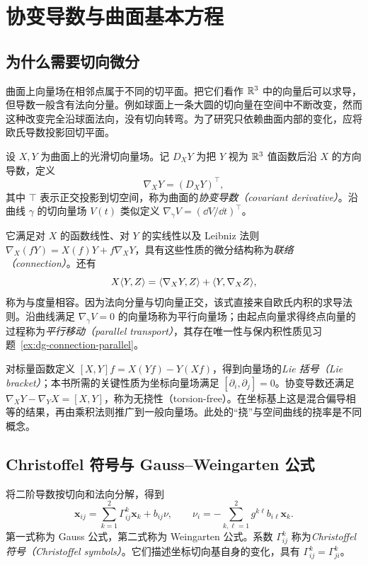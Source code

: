 \setcounter{chapter}{7} %
\chapter{协变导数与曲面基本方程}
\label{chap:dg-connection}

\section{为什么需要切向微分}
曲面上向量场在相邻点属于不同的切平面。把它们看作 $\mathbb R^3$ 中的向量后可以求导，但导数一般含有法向分量。例如球面上一条大圆的切向量在空间中不断改变，然而这种改变完全沿球面法向，没有切向转弯。为了研究只依赖曲面内部的变化，应将欧氏导数投影回切平面。

\begin{definition}[协变导数]
设 $X,Y$ 为曲面上的光滑切向量场。记 $D_XY$ 为把 $Y$ 视为 $\mathbb R^3$ 值函数后沿 $X$ 的方向导数，定义
\[
 \nabla_XY=(D_XY)^\top,
\]
其中 $\top$ 表示正交投影到切空间，称为曲面的\emph{协变导数（covariant derivative）}。沿曲线 $\gamma$ 的切向量场 $V(t)$ 类似定义 $\nabla_{\dot\gamma}V=(\dd V/\dd t)^\top$。
\end{definition}
它满足对 $X$ 的函数线性、对 $Y$ 的实线性以及 Leibniz 法则 $\nabla_X(fY)=X(f)Y+f\nabla_XY$，具有这些性质的微分结构称为\emph{联络（connection）}。还有
\begin{equation}
 X\langle Y,Z\rangle=\langle \nabla_XY,Z\rangle+\langle Y,\nabla_XZ\rangle,
 \label{eq:dg-metric-compatible}
\end{equation}
称为与度量相容。因为法向分量与切向量正交，该式直接来自欧氏内积的求导法则。沿曲线满足 $\nabla_{\dot\gamma}V=0$ 的向量场称为平行向量场；由起点向量求得终点向量的过程称为\emph{平行移动（parallel transport）}，其存在唯一性与保内积性质见习题~\ref{ex:dg-connection-parallel}。

对标量函数定义 $[X,Y]f=X(Yf)-Y(Xf)$，得到向量场的\emph{Lie 括号（Lie bracket）}；本书所需的关键性质为坐标向量场满足 $[\partial_i,\partial_j]=0$。协变导数还满足 $\nabla_XY-\nabla_YX=[X,Y]$，称为无挠性（torsion-free）。在坐标基上这是混合偏导相等的结果，再由乘积法则推广到一般向量场。此处的“挠”与空间曲线的挠率是不同概念。

\section{Christoffel 符号与 Gauss--Weingarten 公式}
将二阶导数按切向和法向分解，得到
\begin{equation}
 \mathbf x_{ij}=\sum_{k=1}^2\Gamma^k_{ij}\mathbf x_k+b_{ij}\nu,
 \qquad
 \nu_i=-\sum_{k,\ell=1}^2g^{k\ell}b_{i\ell}\mathbf x_k.
 \label{eq:dg-gauss-weingarten}
\end{equation}
第一式称为 Gauss 公式，第二式称为 Weingarten 公式。系数 $\Gamma^k_{ij}$ 称为\emph{Christoffel 符号（Christoffel symbols）}。它们描述坐标切向基自身的变化，具有 $\Gamma^k_{ij}=\Gamma^k_{ji}$。

